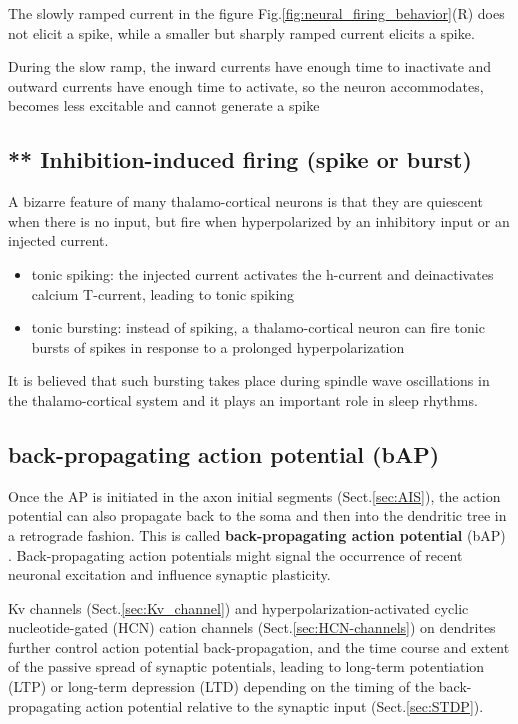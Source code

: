The slowly ramped current in the figure Fig.\ref{fig:neural_firing_behavior}(R)
does not elicit a spike, while a smaller but sharply ramped current elicits a
spike.

During the slow ramp, the inward currents have enough time to inactivate and
outward currents have enough time to activate, so the neuron accommodates,
becomes less excitable and cannot generate a spike

\subsection{** Inhibition-induced firing (spike or burst)}
\label{sec:inhibition-induced-firing}
\label{sec:inhibition-induced-spike}
\label{sec:inhibition-induced-burst}

A bizarre feature of  many thalamo-cortical neurons  is that they are quiescent
when there is no input, but fire when hyperpolarized by an inhibitory input or
an injected current.

\begin{itemize}
  \item tonic spiking: the injected current activates the h-current and deinactivates calcium T-current,
leading to tonic spiking
 
  \item tonic bursting: instead of spiking, a thalamo-cortical neuron can
fire tonic bursts of spikes in response to a prolonged hyperpolarization

\end{itemize}
It is believed that such bursting takes place during
spindle wave oscillations in the thalamo-cortical system and it
plays an important role in sleep rhythms.

\subsection{back-propagating action potential (bAP)}
\label{sec:bAP}
\label{sec:back-propagating_AP}


Once the AP is initiated in the axon initial segments (Sect.\ref{sec:AIS}), the
action potential can also propagate back to the soma and then into the dendritic
tree in a retrograde fashion.
This is called {\bf back-propagating action potential} (bAP)
\citep{spruston1995}.
Back-propagating action potentials might signal the occurrence of recent
neuronal excitation and influence synaptic plasticity.

Kv channels (Sect.\ref{sec:Kv_channel}) and hyperpolarization-activated cyclic
nucleotide-gated (HCN) cation channels (Sect.\ref{sec:HCN-channels}) on
dendrites further control action potential back-propagation, and the time course
and extent of the passive spread of synaptic potentials, leading to long-term
potentiation
 (LTP) or long-term depression
 (LTD) depending on the timing of the back-propagating action potential relative to the
synaptic input (Sect.\ref{sec:STDP}).



